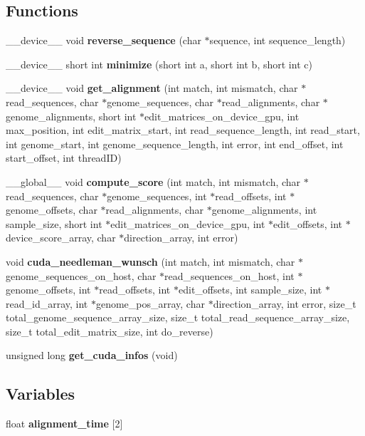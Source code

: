 \subsection*{Functions}
\begin{CompactItemize}
\item 
\_\-\_\-device\_\-\_\- void {\bf reverse\_\-sequence} (char $\ast$sequence, int sequence\_\-length)
\item 
\_\-\_\-device\_\-\_\- short int {\bf minimize} (short int a, short int b, short int c)
\item 
\_\-\_\-device\_\-\_\- void {\bf get\_\-alignment} (int match, int mismatch, char $\ast$read\_\-sequences, char $\ast$genome\_\-sequences, char $\ast$read\_\-alignments, char $\ast$genome\_\-alignments, short int $\ast$edit\_\-matrices\_\-on\_\-device\_\-gpu, int max\_\-position, int edit\_\-matrix\_\-start, int read\_\-sequence\_\-length, int read\_\-start, int genome\_\-start, int genome\_\-sequence\_\-length, int error, int end\_\-offset, int start\_\-offset, int threadID)
\item 
\_\-\_\-global\_\-\_\- void {\bf compute\_\-score} (int match, int mismatch, char $\ast$read\_\-sequences, char $\ast$genome\_\-sequences, int $\ast$read\_\-offsets, int $\ast$genome\_\-offsets, char $\ast$read\_\-alignments, char $\ast$genome\_\-alignments, int sample\_\-size, short int $\ast$edit\_\-matrices\_\-on\_\-device\_\-gpu, int $\ast$edit\_\-offsets, int $\ast$device\_\-score\_\-array, char $\ast$direction\_\-array, int error)
\item 
void {\bf cuda\_\-needleman\_\-wunsch} (int match, int mismatch, char $\ast$genome\_\-sequences\_\-on\_\-host, char $\ast$read\_\-sequences\_\-on\_\-host, int $\ast$genome\_\-offsets, int $\ast$read\_\-offsets, int $\ast$edit\_\-offsets, int sample\_\-size, int $\ast$read\_\-id\_\-array, int $\ast$genome\_\-pos\_\-array, char $\ast$direction\_\-array, int error, size\_\-t total\_\-genome\_\-sequence\_\-array\_\-size, size\_\-t total\_\-read\_\-sequence\_\-array\_\-size, size\_\-t total\_\-edit\_\-matrix\_\-size, int do\_\-reverse)
\item 
unsigned long {\bf get\_\-cuda\_\-infos} (void)
\end{CompactItemize}
\subsection*{Variables}
\begin{CompactItemize}
\item 
float {\bf alignment\_\-time} [2]
\end{CompactItemize}


